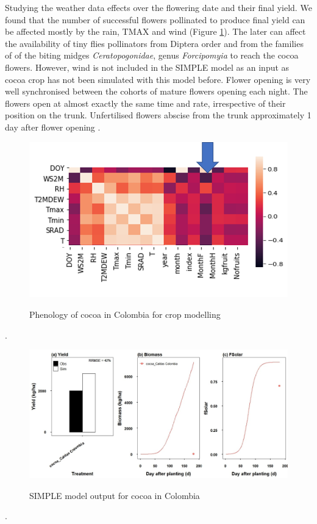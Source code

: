 \documentclass[gene,journal,article,submit,moreauthors,pdftex]{Definitions/mdpi}
\begin{document}
Studying the weather data effects over the flowering date and their final yield. We found that the number of successful flowers pollinated to produce final yield can be affected mostly by the rain, TMAX and wind (Figure \ref{fig:correlation}). The later can affect the availability of tiny flies pollinators from Diptera order and from the families of of the biting midges \textit{Ceratopogonidae},  genus  \textit{Forcipomyia} \citep{Saunders1959, kaufmann1975, sotomayor2020} to reach the cocoa flowers. However, wind is not included in the SIMPLE model as an input as cocoa crop has not been simulated with this model before. Flower opening is very well synchronised between the cohorts of mature flowers opening each night. The flowers open at almost exactly the same time and rate, irrespective of their position on the trunk. Unfertilised flowers abscise from the trunk approximately 1 day after flower opening  \citep{Niemenak2010}. 
\begin{figure}[h]
	\centering
	\caption{\footnotesize {Phenology of cocoa in Colombia for crop modelling\\}} 
	\includegraphics[scale=0.7]{images/correlation.png}\\
	\label{fig:correlation}
\end{figure}.

\begin{figure}[h]
	\centering
	\caption{\footnotesize {SIMPLE model output for cocoa in Colombia }} 
	\includegraphics[scale=0.4]{images/outmodel.jpg}\\
	\label{fig:m1}
\end{figure}.
\end{document}
